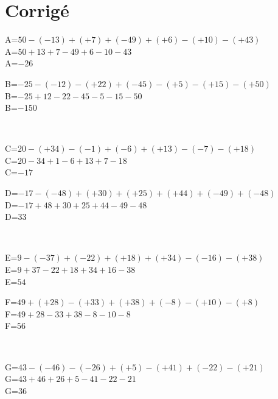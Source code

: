 \documentclass{article}%
\begin{document}
\section{Corrigé}%
\label{sec:Corrig}%
\begin{minipage}{0.5\textwidth}%
A=$50-(-13)+(+7)+(-49)+(+6)-(+10)-(+43)$\\%
A=$50+13+7-49+6-10-43$\\%
A=$-26$\\%
\end{minipage}%
\begin{minipage}{0.5\textwidth}%
B=$-25-(-12)-(+22)+(-45)-(+5)-(+15)-(+50)$\\%
B=$-25+12-22-45-5-15-50$\\%
B=$-150$\\%
\end{minipage}%
\\%
\begin{minipage}{0.5\textwidth}%
C=$20-(+34)-(-1)+(-6)+(+13)-(-7)-(+18)$\\%
C=$20-34+1-6+13+7-18$\\%
C=$-17$\\%
\end{minipage}%
\begin{minipage}{0.5\textwidth}%
D=$-17-(-48)+(+30)+(+25)+(+44)+(-49)+(-48)$\\%
D=$-17+48+30+25+44-49-48$\\%
D=$33$\\%
\end{minipage}%
\\%
\begin{minipage}{0.5\textwidth}%
E=$9-(-37)+(-22)+(+18)+(+34)-(-16)-(+38)$\\%
E=$9+37-22+18+34+16-38$\\%
E=$54$\\%
\end{minipage}%
\begin{minipage}{0.5\textwidth}%
F=$49+(+28)-(+33)+(+38)+(-8)-(+10)-(+8)$\\%
F=$49+28-33+38-8-10-8$\\%
F=$56$\\%
\end{minipage}%
\\%
\begin{minipage}{0.5\textwidth}%
G=$43-(-46)-(-26)+(+5)-(+41)+(-22)-(+21)$\\%
G=$43+46+26+5-41-22-21$\\%
G=$36$\\%
\end{minipage}%
\end{document}
